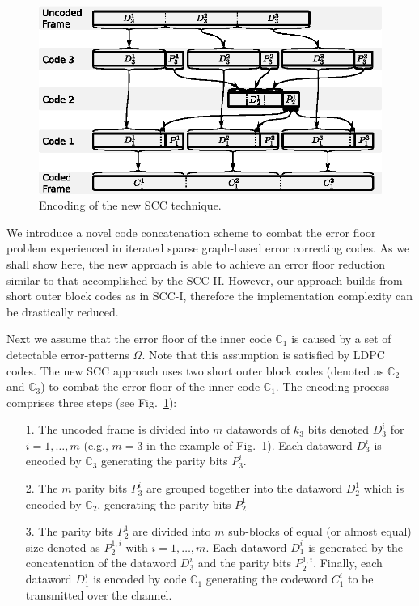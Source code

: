 \documentclass[conference]{IEEEtran}
\newcommand{\C}{\mathbb{C}}  %
\newcommand{\ScaleA}{1.0} %
\begin{document}
\begin{figure}[t]
  \centerline{\includegraphics[width=\ScaleA\columnwidth]{figures_sources/drawing_v10_proposed_1_encoder.eps}}%
    \caption{Encoding of the new SCC technique.}
    \label{fig:pro1enc} 
\end{figure}

We introduce a novel code concatenation scheme to combat the error
floor problem experienced in iterated sparse graph-based error
correcting codes. As we shall show here, the new approach is able to
achieve an error floor reduction similar to that accomplished by the
SCC-II. However, our approach builds from short outer block codes as
in SCC-I, therefore the implementation complexity can be drastically
reduced.

Next we assume that the error floor of the inner code $\C_1$ is caused
by a set of detectable error-patterns $\Omega$. Note that this
assumption is satisfied by LDPC codes. The new SCC approach uses two
short outer block codes (denoted as $\C_2$ and $\C_3$) to combat the
error floor of the inner code $\C_1$.  The encoding process comprises
three steps (see Fig.~\ref{fig:pro1enc}):
\begin{itemize}
\item[1.] The uncoded frame is divided into $m$ datawords of $k_3$
  bits denoted $D^i_3$ for $i=1,\ldots,m$ (e.g., $m=3$ in the example
  of Fig.~\ref{fig:pro1enc}). Each dataword $D^i_3$ is encoded by
  $\C_3$ generating the parity bits $P^i_3$.
\item[2.] The $m$ parity bits $P^i_3$ are grouped together into the
  dataword $D^1_2$ which is encoded by $\C_2$, generating the parity
  bits $P^1_2$
\item[3.] The parity bits $P^1_2$ are divided into $m$ sub-blocks of
  equal (or almost equal) size denoted as $P^{1,i}_2$ with
  $i=1,\ldots,m$. Each dataword $D^i_1$ is generated by the
  concatenation of the dataword $D^i_3$ and the parity bits
  $P^{1,i}_2$. Finally, each dataword $D^i_1$ is encoded by code
  $\C_1$ generating the codeword $C^i_1$ to be transmitted over the
  channel.
\end{itemize}
\end{document}
